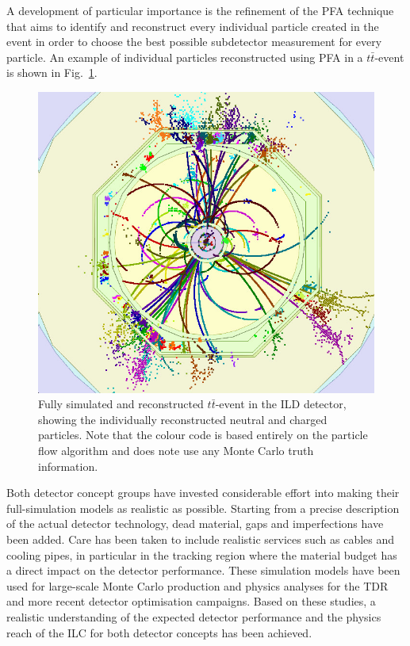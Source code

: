 \documentclass[%
 reprint,
 amsmath,amssymb,
 aps,
]{revtex4-1}
\def\Fig#1{Fig.~\ref{#1}}
\begin{document}
A development of particular importance is the refinement of the 
PFA technique  that aims to identify
and reconstruct
 every individual particle created in the event
 in order to choose the best possible subdetector measurement for every particle. 
An example of individual particles reconstructed using PFA 
 in a $t\bar t$-event is shown in \Fig{fig:ttbarevent}.
\begin{figure}
\begin{center}
\includegraphics[width=0.85\hsize]{figures/ttbar_event_ILD.jpg}
\end{center}
\caption{Fully simulated and reconstructed $t\bar t$-event in the ILD
  detector, showing the individually reconstructed neutral and charged
  particles. Note that the colour code is based entirely on the
  particle flow algorithm 
and does note use any Monte Carlo truth information.}
\label{fig:ttbarevent}
\vspace{-0.7cm}
\end{figure}

Both detector concept groups have invested considerable effort into 
making their full-simulation models as realistic as possible.
Starting from a precise description of the actual 
detector technology, dead material, gaps and imperfections have been added.
Care has been taken to include realistic services such as cables and 
cooling pipes, in particular in the tracking region where
the material budget has a direct impact on the detector performance.
These simulation models have been used for large-scale Monte Carlo
production
 and physics analyses for the TDR and more recent detector optimisation
campaigns. Based on these studies, a 
realistic understanding of the expected detector performance and the physics
reach of the ILC for both detector concepts has been
achieved.
\end{document}
